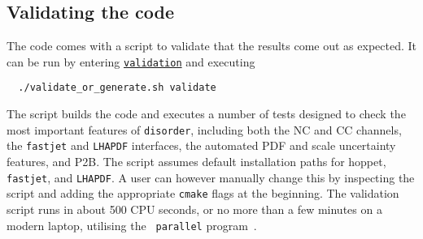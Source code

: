 \documentclass[submission, PhysCodeb]{SciPost_better_arXiv}
\newcommand{\hoppet}{{\sc hoppet}}
\newcommand{\disorder}{{\tt disorder}}
\newcommand{\fastjet}{{\tt fastjet}}
\newcommand{\lhapdf}{{\tt LHAPDF}}
\newcommand{\ttt}[1]{\texttt{#1}}
\newcommand{\repolink}[2]{\href{https://github.com/alexanderkarlberg/disorder/blob/master/#1}{\ttt{#2}}}
\newcommand{\masterlink}[1]{\repolink{#1}{#1}}
\begin{document}
\subsection{Validating the code}
The code comes with a script to validate that the results come out as
expected. It can be run by entering \masterlink{validation} and
executing
\begin{lstlisting}
  ./validate_or_generate.sh validate
\end{lstlisting}
The script builds the code and executes a number of tests designed to
check the most important features of \disorder{}, including both the
NC and CC channels, the \fastjet{} and \lhapdf{} interfaces, the
automated PDF and scale uncertainty features, and P2B. The script
assumes default installation paths for \hoppet{}, \fastjet{}, and
\lhapdf{}. A user can however manually change this by inspecting the
script and adding the appropriate {\tt cmake} flags at the
beginning. The validation script runs in about 500 CPU seconds, or no
more than a few minutes on a modern laptop, utilising the {\tt
  parallel} program~\cite{tange_2021_5233953}.
\end{document}
